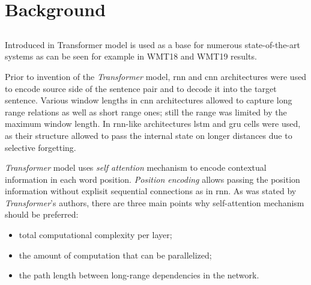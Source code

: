 \chapter{Background}

\section{}


\section{}

Introduced in  Transformer model is used as a base
for numerous state-of-the-art systems as can be seen for example in 
WMT18  and
WMT19  results.

Prior to invention of the \textit{Transformer} model, \acrfull{rnn} and \acrfull{cnn}
architectures were used
to encode source side of the sentence pair and to decode it into the target sentence.
Various window lengths in \acrshort{cnn} architectures allowed to capture long range relations
as well as short range ones; still the range was limited by the maximum window length.
In \acrshort{rnn}-like architectures \acrfull{lstm} and \acrfull{gru} cells were used,
as their structure allowed to pass the internal state on longer distances
due to selective forgetting.

\textit{Transformer} model uses \textit{self attention} mechanism to encode contextual
information in each word position. \textit{Position encoding} allows passing the position
information without explisit sequential connections as in \acrshort{rnn}.
As was stated by \textit{Transformer}'s authors, there are three main points why
self-attention mechanism should be preferred:
\begin{itemize}
  \item total computational complexity per layer;
  \item the amount of computation that can be parallelized;
  \item the path length between long-range dependencies in the network.
\end{itemize}

